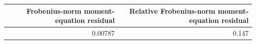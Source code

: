 \begin{tabular}{rr}
\toprule
Frobenius-norm moment-equation residual & Relative Frobenius-norm moment-equation residual \\
\midrule
0.00787 & 0.147 \\
\bottomrule
\end{tabular}
